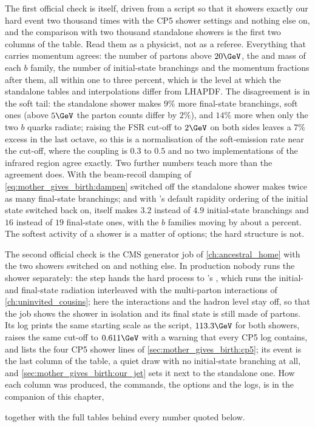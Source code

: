 The first official check is \PYTHIA itself, driven from a script so that it
showers exactly our hard event two thousand times with the CP5 shower
settings and nothing else on, and the comparison with two thousand
standalone showers is the first two columns of the table. Read them as a
physicist, not as a referee. Everything that carries momentum agrees: the
number of partons above $20\GeV$, the \pt and mass of each $b$ family, the
number of initial-state branchings and the momentum fractions after them,
all within one to three percent, which is the level at which the standalone
tables and interpolations differ from LHAPDF. The disagreement is in the soft
tail: the standalone shower makes $9\%$ more final-state branchings, soft
ones (above $5\GeV$ the parton counts differ by $2\%$), and $14\%$ more when
only the two $b$ quarks radiate; raising the FSR cut-off to $2\GeV$ on both sides leaves a $7\%$
excess in the last octave, so this is a normalisation of the soft-emission
rate near the cut-off, where the coupling is $0.3$ to $0.5$ and no two
implementations of the infrared region agree exactly. Two further numbers
teach more than the agreement does. With the beam-recoil damping of
\cref{eq:mother_gives_birth:dampen} switched off the standalone shower makes
twice as many final-state branchings; and with \PYTHIA's default rapidity
ordering of the initial state switched back on, \PYTHIA itself makes $3.2$
instead of $4.9$ initial-state branchings and $16$ instead of $19$
final-state ones, with the $b$ families moving by about a percent. The softest
activity of a shower is a matter of options; the hard structure is not.
\label{sec:mother_gives_birth:cmssw}

The second official check is the CMS generator job of \cref{ch:ancestral_home}
with the two showers switched on and nothing else. In production nobody
runs the shower separately: the  step hands the hard process to
\PYTHIA's , which runs the initial- and final-state
radiation interleaved with the multi-parton interactions of
\cref{ch:uninvited_cousins}; here the interactions and the hadron level
stay off, so that the job shows the shower in isolation and its final
state is still made of partons. Its log prints the same starting scale as
the script, $113.3\GeV$ for both showers, raises the same cut-off to
$0.611\GeV$ with a warning that every CP5 log contains, and lists the four
CP5 shower lines of \cref{sec:mother_gives_birth:cp5}; its event is the last
column of the table, a quiet draw with no initial-state branching at all,
and \cref{sec:mother_gives_birth:our_jet} sets it next to the standalone
one. How each column was produced, the commands, the
options and the logs, is in the companion of this chapter,
\begin{center}
\end{center}
together with the full tables behind every number quoted below.

